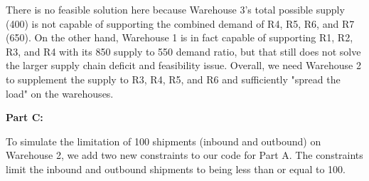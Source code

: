 \documentclass[paper=a4, fontsize=11pt]{scrartcl} %
\numberwithin{equation}{section} %
\numberwithin{figure}{section} %
\numberwithin{table}{section} %
\begin{document}
	There is no feasible solution here because Warehouse 3's total possible supply (400) is not capable of supporting the combined demand of R4, R5, R6, and R7 (650). On the other hand, Warehouse 1 is in fact capable of supporting R1, R2, R3, and R4 with its 850 supply to 550 demand ratio, but that still does not solve the larger supply chain deficit and feasibility issue. Overall, we need Warehouse 2 to supplement the supply to R3, R4, R5, and R6 and sufficiently "spread the load" on the warehouses.\newline
    
\textbf{Part C:}\newline

To simulate the limitation of 100 shipments (inbound and outbound) on Warehouse 2, we add two new constraints to our code for Part A. The constraints limit the inbound and outbound shipments to being less than or equal to 100.\newline
\end{document}
